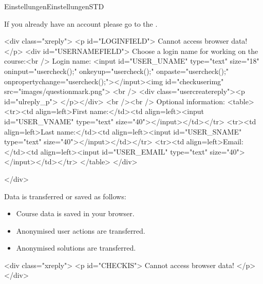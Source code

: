 \begin{MXContent}{Einstellungen}{Einstellungen}{STD}
\MGlobalConfTag
{}

If you already have an account please go to the .

\begin{html}
<div class="xreply">
<p id="LOGINFIELD">
Cannot access browser data!
</p>
<div id="USERNAMEFIELD">
Choose a login name for working on the course:<br />
Login name: <input id="USER_UNAME" type="text" size="18" oninput="usercheck();" onkeyup="usercheck();" onpaste="usercheck();" onpropertychange="usercheck();"></input><img id="checkuserimg" src="images/questionmark.png">
<br />
<div class="usercreatereply"><p id="ulreply_p"> </p></div>
<br /><br />
Optional information:
<table>
  <tr><td align=left>First name:</td><td align=left><input id="USER_VNAME" type="text" size="40"></input></td></tr>
  <tr><td align=left>Last name:</td><td align=left><input id="USER_SNAME" type="text" size="40"></input></td></tr>
  <tr><td align=left>Email:</td><td align=left><input id="USER_EMAIL" type="text" size="40"></input></td></tr>
</table>
</div>

</div>

\end{html}





Data is transferred or saved as follows:

\begin{itemize}
\item{Course data is saved in your browser.}
\item{Anonymised user actions are transferred.}
\item{Anonymised solutions are transferred.}
\end{itemize}
\begin{html}
<div class="xreply">
<p id="CHECKIS">
Cannot access browser data!
</p>
</div>
\end{html}


\end{MXContent}
